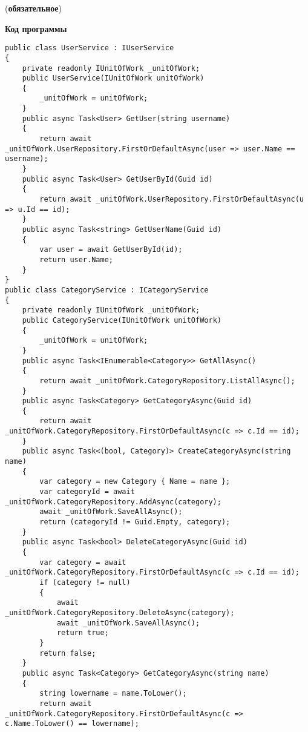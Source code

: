 \normalfont
\vspace{-\baselineskip} %
\begin{center}
       (\textbf{обязательное})

\textbf{Код программы}

\end{center}

\begin{lstlisting}[style=csharpinlinestyle]
public class UserService : IUserService
{
    private readonly IUnitOfWork _unitOfWork;
    public UserService(IUnitOfWork unitOfWork)
    {
        _unitOfWork = unitOfWork;
    }
    public async Task<User> GetUser(string username)
    {
        return await _unitOfWork.UserRepository.FirstOrDefaultAsync(user => user.Name == username);
    }
    public async Task<User> GetUserById(Guid id)
    {
        return await _unitOfWork.UserRepository.FirstOrDefaultAsync(u => u.Id == id);
    }
    public async Task<string> GetUserName(Guid id)
    {
        var user = await GetUserById(id);
        return user.Name;
    }
}
public class CategoryService : ICategoryService
{
    private readonly IUnitOfWork _unitOfWork;
    public CategoryService(IUnitOfWork unitOfWork)
    {
        _unitOfWork = unitOfWork;
    }
    public async Task<IEnumerable<Category>> GetAllAsync()
    {
        return await _unitOfWork.CategoryRepository.ListAllAsync();
    }
    public async Task<Category> GetCategoryAsync(Guid id)
    {
        return await _unitOfWork.CategoryRepository.FirstOrDefaultAsync(c => c.Id == id);
    }
    public async Task<(bool, Category)> CreateCategoryAsync(string name)
    {
        var category = new Category { Name = name };
        var categoryId = await _unitOfWork.CategoryRepository.AddAsync(category);
        await _unitOfWork.SaveAllAsync();
        return (categoryId != Guid.Empty, category);
    }
    public async Task<bool> DeleteCategoryAsync(Guid id)
    {
        var category = await _unitOfWork.CategoryRepository.FirstOrDefaultAsync(c => c.Id == id);
        if (category != null)
        {
            await _unitOfWork.CategoryRepository.DeleteAsync(category);
            await _unitOfWork.SaveAllAsync();
            return true;
        }
        return false;
    }
    public async Task<Category> GetCategoryAsync(string name)
    {
        string lowername = name.ToLower();
        return await _unitOfWork.CategoryRepository.FirstOrDefaultAsync(c => c.Name.ToLower() == lowername);

\end{lstlisting}
